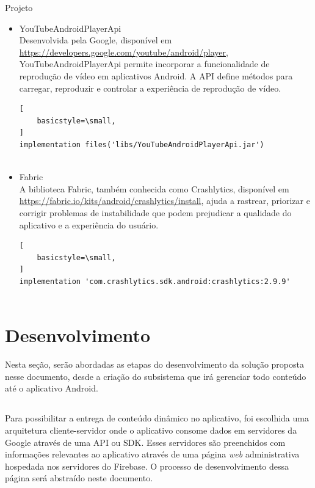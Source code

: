 \documentclass[
	12pt,				%
	openany,			%
	twoside,			%
	a4paper,			%
	english,			%
	french,				%
	spanish,			%
	brazil				%
	]{abntex2}
\begin{document}
\begin{chapter}{Projeto}
\begin{itemize}
\begin{lstlisting}[
    basicstyle=\small,
]
\end{lstlisting}
\item{YouTubeAndroidPlayerApi} \\
   Desenvolvida pela Google, disponível em \url{https://developers.google.com/youtube/android/player}, YouTubeAndroidPlayerApi permite incorporar a funcionalidade de reprodução de vídeo em aplicativos Android. A API  define métodos para carregar, reproduzir 
e controlar a experiência de reprodução de vídeo.
      \begin{lstlisting}[
    basicstyle=\small,
]
implementation files('libs/YouTubeAndroidPlayerApi.jar')
   
\end{lstlisting}
\item{Fabric} \\
   A biblioteca Fabric, também conhecida como Crashlytics, disponível em \url{https://fabric.io/kits/android/crashlytics/install}, ajuda a rastrear, priorizar e corrigir problemas de instabilidade que podem prejudicar a qualidade do aplicativo e a experiência do usuário.
   \begin{lstlisting}[
    basicstyle=\small,
]
implementation 'com.crashlytics.sdk.android:crashlytics:2.9.9'
   
\end{lstlisting}
\end{itemize}

\section{Desenvolvimento}
Nesta seção, serão abordadas as etapas do desenvolvimento da solução proposta nesse documento, desde a criação do subsistema que irá gerenciar todo conteúdo até o aplicativo Android. 

\subsection{}
Para possibilitar a entrega de conteúdo dinâmico no aplicativo, foi escolhida uma arquitetura cliente-servidor onde o aplicativo consome dados em servidores da Google através de uma API ou SDK. Esses servidores são preenchidos com informações relevantes ao aplicativo através de uma página \textit{web} administrativa hospedada nos servidores do Firebase. O processo de desenvolvimento dessa página será abstraído neste documento.\\



\end{chapter}
\end{document}
